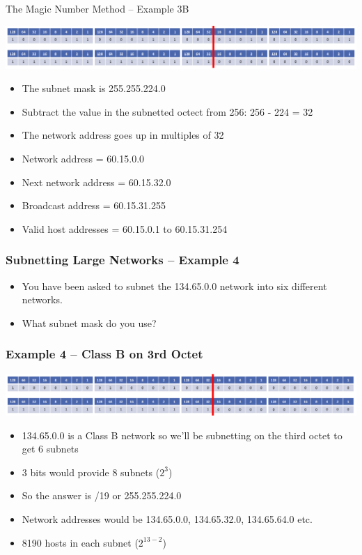 \documentclass[pdflatex,compress]{beamer}
\begin{document}
\begin{frame}{The Magic Number Method – Example 3B}
	\begin{center}
		\includegraphics[width=\linewidth]{img/img25}
	\end{center}
	\begin{itemize}
		\item The subnet mask is 255.255.224.0
		\item Subtract the value in the subnetted octect from 256: 256 - 224 = 32
		\item The network address goes up in multiples of 32
		\item Network address = 60.15.0.0
		\item Next network address = 60.15.32.0
		\item Broadcast address = 60.15.31.255
		\item Valid host addresses = 60.15.0.1 to 60.15.31.254
	\end{itemize}
\end{frame}

\begin{frame}
	\frametitle{Subnetting Large Networks – Example 4}
	\begin{itemize}
		\item You have been asked to subnet the 134.65.0.0 network into six different networks.
		\item What subnet mask do you use?
	\end{itemize}
\end{frame}

\begin{frame}
	\frametitle{Example 4 – Class B on 3rd Octet}
	\begin{center}
		\includegraphics[width=\linewidth]{img/img26}
	\end{center}
	\begin{itemize}
		\item 134.65.0.0 is a Class B network so we’ll be subnetting on the third octet to get 6 subnets
		\item 3 bits would provide 8 subnets ($ 2^3 $)
		\item So the answer is /19 or 255.255.224.0
		\item Network addresses would be 134.65.0.0, 134.65.32.0, 134.65.64.0 etc.
		\item 8190 hosts in each subnet ($ 2^{13-2} $)
	\end{itemize}
\end{frame}
\end{document}
